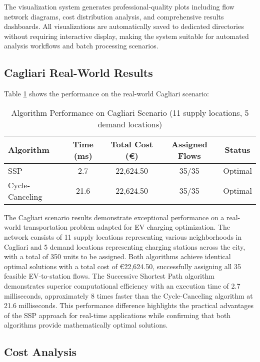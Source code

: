 \documentclass[12pt,a4paper]{article}
\begin{document}
The visualization system generates professional-quality plots including flow network diagrams, cost distribution analysis, and comprehensive results dashboards. All visualizations are automatically saved to dedicated directories without requiring interactive display, making the system suitable for automated analysis workflows and batch processing scenarios.

\subsection{Cagliari Real-World Results}

Table \ref{tab:cagliari_results} shows the performance on the real-world Cagliari scenario:

\begin{table}[H]
\centering
\caption{Algorithm Performance on Cagliari Scenario (11 supply locations, 5 demand locations)}
\label{tab:cagliari_results}
\begin{tabular}{@{}lcccc@{}}
\toprule
\textbf{Algorithm} & \textbf{Time (ms)} & \textbf{Total Cost (€)} & \textbf{Assigned Flows} & \textbf{Status} \\
\midrule
SSP & 2.7 & 22,624.50 & 35/35 & Optimal \\
Cycle-Canceling & 21.6 & 22,624.50 & 35/35 & Optimal \\
\bottomrule
\end{tabular}
\end{table}

The Cagliari scenario results demonstrate exceptional performance on a real-world transportation problem adapted for EV charging optimization. The network consists of 11 supply locations representing various neighborhoods in Cagliari and 5 demand locations representing charging stations across the city, with a total of 350 units to be assigned. Both algorithms achieve identical optimal solutions with a total cost of €22,624.50, successfully assigning all 35 feasible EV-to-station flows. The Successive Shortest Path algorithm demonstrates superior computational efficiency with an execution time of 2.7 milliseconds, approximately 8 times faster than the Cycle-Canceling algorithm at 21.6 milliseconds. This performance difference highlights the practical advantages of the SSP approach for real-time applications while confirming that both algorithms provide mathematically optimal solutions.

\subsection{Cost Analysis}
\end{document}
